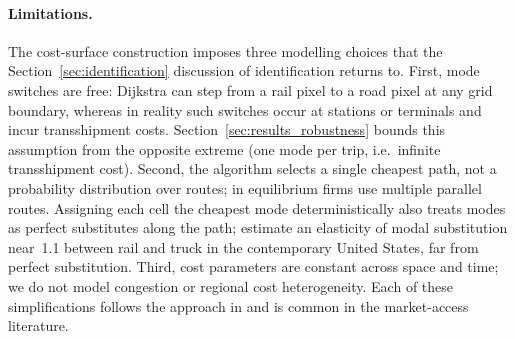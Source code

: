 \paragraph{Limitations.}
The cost-surface construction imposes three modelling choices that the
Section~\ref{sec:identification} discussion of identification returns to.
First, mode switches are free: Dijkstra can step from a rail pixel to a
road pixel at any grid boundary, whereas in reality such switches
occur at stations or terminals and incur transshipment costs.
Section~\ref{sec:results_robustness} bounds this assumption from the
opposite extreme (one mode per trip, i.e.\ infinite transshipment
cost). Second,
the algorithm selects a single cheapest path, not a probability
distribution over routes; in equilibrium firms use multiple parallel
routes. Assigning each cell the cheapest mode deterministically also
treats modes as perfect substitutes along the path;
\citet{fuchswong2026} estimate an elasticity of modal substitution
near~1.1 between rail and truck in the contemporary United States,
far from perfect substitution.
Third, cost parameters are constant across space and time; we
do not model congestion or regional cost heterogeneity. Each of these
simplifications follows the approach in
\citet{donaldsonhornbeck2016} and is common in the market-access
literature.

